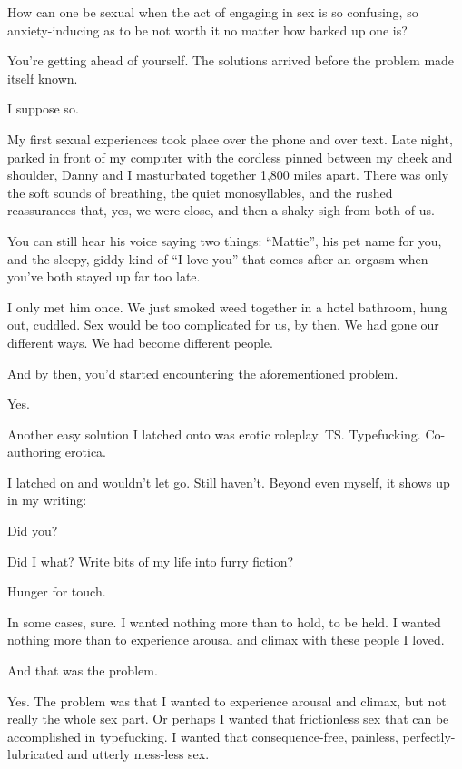 \noindent How can one be sexual when the act of engaging in sex is so confusing, so anxiety-inducing as to be not worth it no matter how barked up one is?

\begin{ally}
You're getting ahead of yourself. The solutions arrived before the problem made itself known.
\end{ally}
I suppose so.

My first sexual experiences took place over the phone and over text. Late night, parked in front of my computer with the cordless pinned between my cheek and shoulder, Danny and I masturbated together 1,800 miles apart. There was only the soft sounds of breathing, the quiet monosyllables, and the rushed reassurances that, yes, we were close, and then a shaky sigh from both of us.

\begin{ally}
You can still hear his voice saying two things: ``Mattie'', his pet name for you, and the sleepy, giddy kind of ``I love you'' that comes after an orgasm when you've both stayed up far too late.
\end{ally}
I only met him once. We just smoked weed together in a hotel bathroom, hung out, cuddled. Sex would be too complicated for us, by then. We had gone our different ways. We had become different people.

\begin{ally}
And by then, you'd started encountering the aforementioned problem.
\end{ally}
Yes.

Another easy solution I latched onto was erotic roleplay. TS. Typefucking. Co-authoring erotica.

I latched on and wouldn't let go. Still haven't. Beyond even myself, it shows up in my writing:

\begin{ally}
Did you?
\end{ally}
Did I what? Write bits of my life into furry fiction?

\begin{ally}
Hunger for touch.
\end{ally}
In some cases, sure. I wanted nothing more than to hold, to be held. I wanted nothing more than to experience arousal and climax with these people I loved.

\begin{ally}
And that was the problem.
\end{ally}
Yes. The problem was that I wanted to experience arousal and climax, but not really the whole sex part. Or perhaps I wanted that frictionless sex that can be accomplished in typefucking. I wanted that consequence-free, painless, perfectly-lubricated and utterly mess-less sex.

